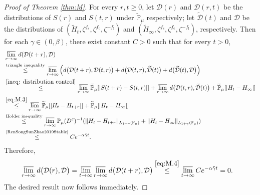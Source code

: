\documentclass[12pt,a4paper]{amsart}
\theoremstyle{plain}
\theoremstyle{definition}
\numberwithin{equation}{section}
\begin{document}
\begin{proof}[Proof of Theorem \ref{thm:M}]
For every $r,t\geq 0$, let $\mathcal D(r)$ and $\mathcal D(r,t)$ be the distributions of $S(r)$ and $S(t,r)$ under $\widetilde{\mathbb P}_{\mu}$ respectively;
let $\widetilde{\mathcal D}(t)$ and $\mathcal D$ be the distributions of $(\widetilde H_t,\zeta^{f_\mathrm s},\zeta^{f_\mathrm c},\zeta^{-f_\mathrm l})$ and $(\widetilde H_\infty,\zeta^{f_\mathrm s},\zeta^{f_\mathrm c},\zeta^{-f_\mathrm l})$, respectively.
 Then for each $\gamma\in (0,\beta)$, there exist constant $C>0$
 such that for every $t > 0$,
\begin{align}
 &\varlimsup_{r\rightarrow \infty}d(\mathcal D(t+r),\mathcal D)
 \\& \overset{\rm triangle~inequality}\leq \varlimsup_{r\rightarrow \infty}\Big( d\big(\mathcal D(t+r),\mathcal D(t,r)\big)+d\big(\mathcal D(t,r),\widetilde{\mathcal D}(t)\big)+d\big(\widetilde{\mathcal D}(t),\mathcal D\big)\Big)
  \\&\overset{\eqref{ineq: distribution control}} \leq \varlimsup_{r\rightarrow \infty}\widetilde{\mathbb P}_{\mu}[|S(t+r) - S(t,r)|]+ \varlimsup_{r\rightarrow \infty} d\big(\mathcal D(t,r),\widetilde{\mathcal D}(t)\big) +\widetilde{\mathbb P}_{\mu}[|H_t-H_{\infty}|]
\\&\overset{\eqref{eq:M.3}}\leq \varlimsup_{r\rightarrow \infty}\widetilde{\mathbb P}_{\mu}[|H_t - H_{t+r}|]+\widetilde{\mathbb P}_{\mu}[|H_t-H_{\infty}|]
  \\&\overset{\text{H\"older inequality}}\leq \varlimsup_{r\rightarrow \infty}\mathbb P_{\mu}(D^c)^{-1}(\|H_t-H_{t+r}\|_{L_{1+\gamma} (\mathbb P_\mu)}+\|H_t-H_{\infty}\|_{L_{1+\gamma} (\mathbb P_\mu)})
\\&\label{eq:M.4}\overset{\text{\cite[Lemma 3.3]{RenSongSunZhao2019Stable}}}\leq C e^{-\alpha \tilde \gamma t}.
\end{align}
Therefore,
\begin{align}
 &\varlimsup_{r\rightarrow \infty}d\big(\mathcal D(r),\mathcal D\big)
 =\varlimsup_{t\to \infty}\varlimsup_{r\rightarrow \infty}d\big(\mathcal D(t+r),\mathcal D\big)
\overset{\eqref{eq:M.4}}\leq \varlimsup_{t\rightarrow \infty}Ce^{-\alpha \tilde \gamma t} = 0.
\end{align}
The desired result now follows immediately.


\end{proof}
\end{document}
